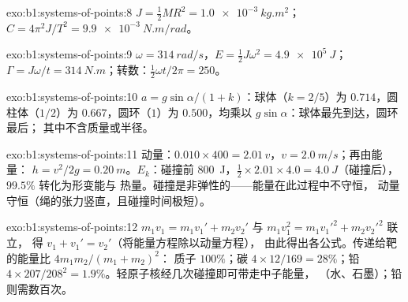 \begin{solution}{exo:b1:systems-of-points:8}
$J = \tfrac12 MR^2 = \qty{1.0e-3}{kg.m^2}$；$C = 4\pi^2J/T^2 = \qty{9.9e-3}{N.m/rad}$。
\end{solution}

\begin{solution}{exo:b1:systems-of-points:9}
$\omega = \qty{314}{rad/s}$，$E = \tfrac12 J\omega^2 = \qty{4.9e5}{J}$；
$\Gamma = J\omega/t = \qty{314}{N.m}$；转数：$\tfrac12\omega t/2\pi = 250$。
\end{solution}

\begin{solution}{exo:b1:systems-of-points:10}
$a = g\sin\alpha/(1 + k)$：球体（$k = 2/5$）为 $0.714$，圆柱体（$1/2$）为
$0.667$，圆环（$1$）为 $0.500$，均乘以 $g\sin\alpha$：球体最先到达，圆环最后；
其中不含质量或半径。
\end{solution}

\begin{solution}{exo:b1:systems-of-points:11}
动量：$0.010 \times 400 = 2.01\,v$，$v = \qty{2.0}{m/s}$；再由能量：
$h = v^2/2g = \qty{0.20}{m}$。$E_k$：碰撞前 \qty{800}{J}，$\tfrac12 \times
2.01 \times 4.0 = \qty{4.0}{J}$（碰撞后），$99.5\%$ 转化为形变能与
热量。碰撞是非弹性的——能量在此过程中不守恒，
动量守恒（绳的张力竖直，且碰撞时间极短）。
\end{solution}

\begin{solution}{exo:b1:systems-of-points:12}
$m_1v_1 = m_1v_1' + m_2v_2'$ 与 $m_1v_1^2 = m_1v_1'^2 + m_2v_2'^2$ 联立，
得 $v_1 + v_1' = v_2'$（将能量方程除以动量方程），
由此得出各公式。传递给靶的能量比 $4m_1m_2/(m_1 + m_2)^2$：
质子 $100\%$；碳 $4 \times 12/169 = 28\%$；铅 $4 \times 207/208^2 =
1.9\%$。轻原子核经几次碰撞即可带走中子能量，
（水、石墨）；铅则需数百次。
\end{solution}

